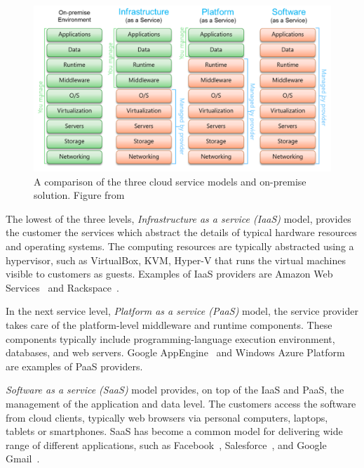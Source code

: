 \begin{figure}[]
  \begin{center}
    \includegraphics[width=\textwidth]{images/cloud-computing-service-models.png}
    \caption{A comparison of the three cloud service models and on-premise solution. Figure from~\cite{Lau:2011:ServiceModels}}
    \label{fig:cloud-computing-service-models}
  \end{center}
\end{figure}

The lowest of the three levels, \emph{Infrastructure as a service (IaaS)} model, provides the customer the services which abstract the details of typical hardware resources and operating systems. The computing resources are typically abstracted using a hypervisor, such as VirtualBox, KVM, Hyper-V that runs the virtual machines visible to customers as guests. Examples of IaaS providers are Amazon Web Services~\cite{Murty:2008:AWS} and Rackspace~\cite{Rackspace:2010:Inc}.~\cite{Mell:2011:ccdef}

In the next service level, \emph{Platform as a service (PaaS)} model, the service provider takes care of the platform-level middleware and runtime components. These components typically include programming-language execution environment, databases, and web servers. Google AppEngine~\cite{Sanderson:2009:GoogleAppEngine} and Windows Azure Platform~\cite{Redkar:2011:Azure} are examples of PaaS providers.~\cite{Mell:2011:ccdef}

\emph{Software as a service (SaaS)} model provides, on top of the IaaS and PaaS, the management of the application and data level. The customers access the software from cloud clients, typically web browsers via personal computers, laptops, tablets or smartphones. SaaS has become a common model for delivering wide range of different applications, such as Facebook~\cite{facebook}, Salesforce~\cite{salesforce}, and Google Gmail~\cite{Teeter:2011:Gmail}.~\cite{Mell:2011:ccdef}

